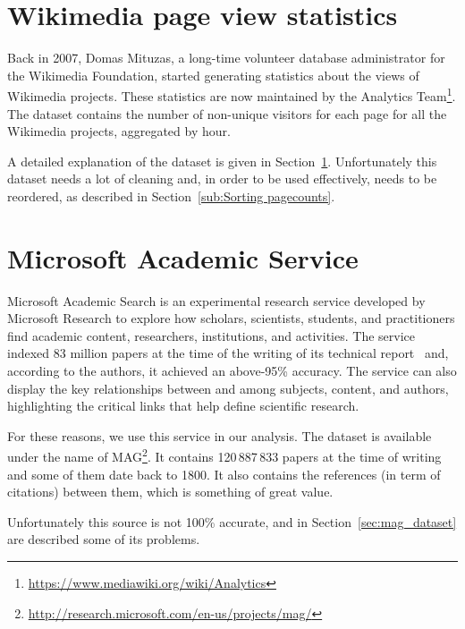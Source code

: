 
\section{Wikimedia page view statistics}
\label{sec:pagecounts}
Back in 2007, Domas Mituzas, a long-time volunteer database administrator for the Wikimedia Foundation, started generating statistics about the views of Wikimedia projects.
These statistics are now maintained by the Analytics Team\footnote{\url{https://www.mediawiki.org/wiki/Analytics}}.
The dataset contains the number of non-unique visitors for each page for all the Wikimedia projects, aggregated by hour.

A detailed explanation of the dataset is given in Section~\ref{sec:pagecounts}.
Unfortunately this dataset needs a lot of cleaning and, in order to be used effectively, needs to be reordered, as described in Section~\ref{sub:Sorting pagecounts}.

\section{Microsoft Academic Service}
\label{sec:mag}
Microsoft Academic Search is an experimental research service developed by Microsoft Research to explore how scholars, scientists, students, and practitioners find academic content, researchers, institutions, and activities.
The service indexed 83 million papers at the time of the writing of its technical report~\cite{Sinha2015} and, according to the authors, it achieved an above-95\% accuracy.
The service can also display the key relationships between and among subjects, content, and authors, highlighting the critical links that help define scientific research.

For these reasons, we use this service in our analysis.
The dataset is available under the name of \ac{MAG}\footnote{\url{http://research.microsoft.com/en-us/projects/mag/}}.
It contains 120\,887\,833 papers at the time of writing and some of them date back to 1800.
It also contains the references (in term of citations) between them, which is something of great value.

Unfortunately this source is not 100\% accurate, and in Section~\ref{sec:mag_dataset} are described some of its problems.




